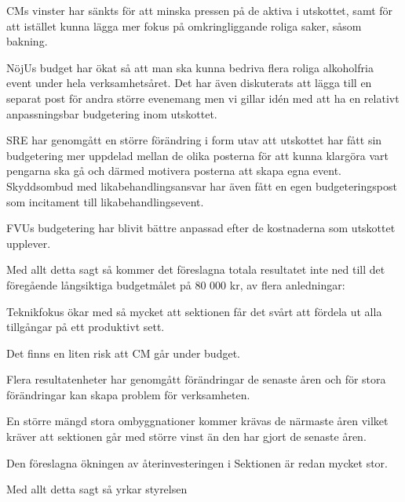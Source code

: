 \documentclass[../_main/handlingar.tex]{subfiles}
\begin{document}
CMs vinster har sänkts för att minska pressen på de aktiva i utskottet, samt för att istället kunna lägga mer fokus på omkringliggande roliga saker, såsom bakning.

NöjUs budget har ökat så att man ska kunna bedriva flera roliga alkoholfria event under hela verksamhetsåret. Det har även diskuterats att lägga till en separat post för andra större evenemang men vi gillar idén med att ha en relativt anpassningsbar budgetering inom utskottet.

SRE har genomgått en större förändring i form utav att utskottet har fått sin budgetering mer uppdelad mellan de olika posterna för att kunna klargöra vart pengarna ska gå och därmed motivera posterna att skapa egna event. 
Skyddsombud med likabehandlingsansvar har även fått en egen budgeteringspost som incitament till likabehandlingsevent.

FVUs budgetering har blivit bättre anpassad efter de kostnaderna som utskottet upplever.

Med allt detta sagt så kommer det föreslagna totala resultatet inte ned till det föregående långsiktiga budgetmålet på 80 000 kr, av flera anledningar: 

\begin{tightdashlist}
    \item Teknikfokus ökar med så mycket att sektionen får det svårt att fördela ut alla tillgångar på ett produktivt sett.
    \item Det finns en liten risk att CM går under budget.
    \item Flera resultatenheter har genomgått förändringar de senaste åren och för stora förändringar kan skapa problem för verksamheten.
    \item En större mängd stora ombyggnationer kommer krävas de närmaste åren vilket kräver att sektionen går med större vinst än den har gjort de senaste åren.
    \item Den föreslagna ökningen av återinvesteringen i Sektionen är redan mycket stor.
\end{tightdashlist}

Med allt detta sagt så yrkar styrelsen
\end{document}
